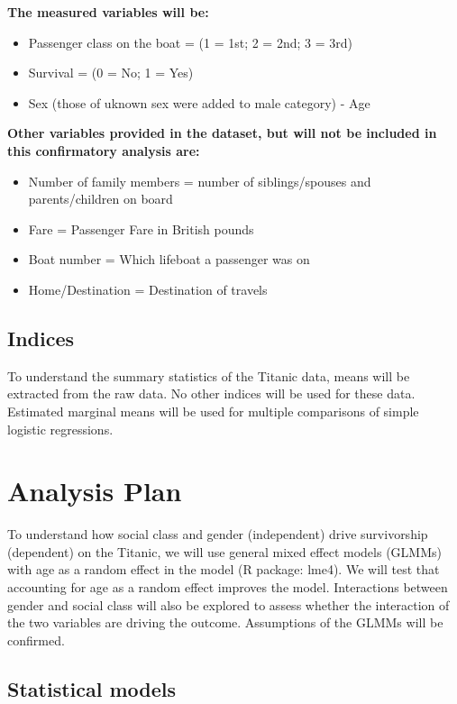 \documentclass[]{article}
\begin{document}
\textbf{The measured variables will be:}

\begin{itemize}
\item
  Passenger class on the boat = (1 = 1st; 2 = 2nd; 3 = 3rd)
\item
  Survival = (0 = No; 1 = Yes)
\item
  Sex (those of uknown sex were added to male category) - Age
\end{itemize}

\textbf{Other variables provided in the dataset, but will not be
included in this confirmatory analysis are:}

\begin{itemize}
\item
  Number of family members = number of siblings/spouses and
  parents/children on board
\item
  Fare = Passenger Fare in British pounds
\item
  Boat number = Which lifeboat a passenger was on
\item
  Home/Destination = Destination of travels
\end{itemize}

\hypertarget{indices}{%
\subsection{Indices}\label{indices}}

To understand the summary statistics of the Titanic data, means will be
extracted from the raw data. No other indices will be used for these
data. Estimated marginal means will be used for multiple comparisons of
simple logistic regressions.

\hypertarget{analysis-plan}{%
\section{Analysis Plan}\label{analysis-plan}}

To understand how social class and gender (independent) drive
survivorship (dependent) on the Titanic, we will use general mixed
effect models (GLMMs) with age as a random effect in the model (R
package: lme4). We will test that accounting for age as a random effect
improves the model. Interactions between gender and social class will
also be explored to assess whether the interaction of the two variables
are driving the outcome. Assumptions of the GLMMs will be confirmed.

\hypertarget{statistical-models}{%
\subsection{Statistical models}\label{statistical-models}}
\end{document}
